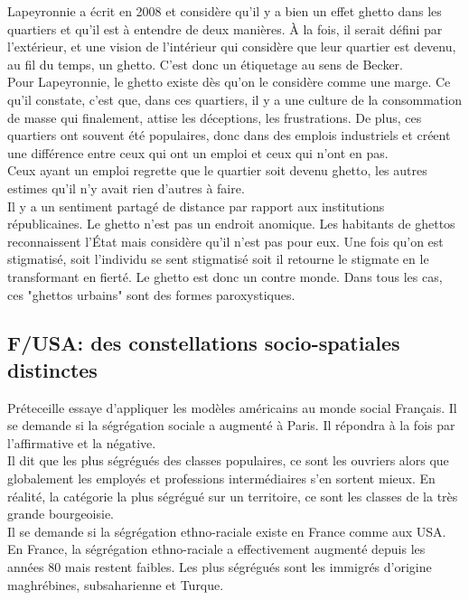\documentclass[12pt, a4paper, openany]{book}
\begin{document}
Lapeyronnie a écrit en 2008 et considère qu'il y a bien un effet ghetto dans les quartiers et qu'il est à entendre de deux manières. À la fois, il serait défini par l'extérieur, et une vision de l'intérieur qui considère que leur quartier est devenu, au fil du temps, un ghetto. C'est donc un étiquetage au sens de Becker. \\
Pour Lapeyronnie, le ghetto existe dès qu'on le considère comme une marge. Ce qu'il constate, c'est que, dans ces quartiers, il y a une culture de la consommation de masse qui finalement, attise les déceptions, les frustrations. De plus, ces quartiers ont souvent été populaires, donc dans des emplois industriels et créent une différence entre ceux qui ont un emploi et ceux qui n'ont en pas. \\
Ceux ayant un emploi regrette que le quartier soit devenu ghetto, les autres estimes qu'il n'y avait rien d'autres à faire. \\
Il y a un sentiment partagé de distance par rapport aux institutions républicaines. Le ghetto n'est pas un endroit anomique. Les habitants de ghettos reconnaissent l'État mais considère qu'il n'est pas pour eux. Une fois qu'on est stigmatisé, soit l'individu se sent stigmatisé soit il retourne le stigmate en le transformant en fierté. Le ghetto est donc un contre monde. Dans tous les cas, ces "ghettos urbains" sont des formes paroxystiques. 


\subsection{F/USA: des constellations socio-spatiales distinctes}

Préteceille essaye d'appliquer les modèles américains au monde social Français. Il se demande si la ségrégation sociale a augmenté à Paris. Il répondra à la fois par l'affirmative et la négative. \\
Il dit que les plus ségrégués des classes populaires, ce sont les ouvriers alors que globalement les employés et professions intermédiaires s'en sortent mieux. En réalité, la catégorie la plus ségrégué sur un territoire, ce sont les classes de la très grande bourgeoisie. \\
Il se demande si la ségrégation ethno-raciale existe en France comme aux USA. En France, la ségrégation ethno-raciale a effectivement augmenté depuis les années 80 mais restent faibles. Les plus ségrégués sont les immigrés d'origine maghrébines, subsaharienne et Turque.
\end{document}
